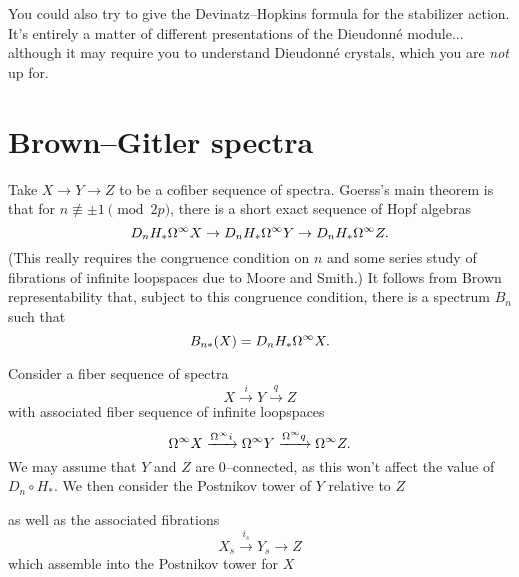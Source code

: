 You could also try to give the Devinatz--Hopkins formula for the stabilizer action.  It's entirely a matter of different presentations of the Dieudonn\'e module... although it may require you to understand Dieudonn\'e crystals, which you are \emph{not} up for.







\section{Brown--Gitler spectra}

Take $X \to Y \to Z$ to be a cofiber sequence of spectra.  Goerss's main theorem is that for $n \not\equiv \pm 1 \pmod{2p}$, there is a short exact sequence of Hopf algebras \[D_n H_* \Omega^\infty X \to D_n H_* \Omega^\infty Y \to D_n H_* \Omega^\infty Z.\]  (This really requires the congruence condition on $n$ and some series study of fibrations of infinite loopspaces due to Moore and Smith.)  It follows from Brown representability that, subject to this congruence condition, there is a spectrum $B_n$ such that \[B_{n*}(X) = D_n H_* \Omega^\infty X.\]




Consider a fiber sequence of spectra \[X \xrightarrow i Y \xrightarrow q Z\] with associated fiber sequence of infinite loopspaces \[\Omega^\infty X \xrightarrow{\Omega^\infty i} \Omega^\infty Y \xrightarrow{\Omega^\infty q} \Omega^\infty Z.\]  We may assume that $Y$ and $Z$ are $0$--connected, as this won't affect the value of $D_n \circ H_*$.  We then consider the Postnikov tower of $Y$ relative to $Z$
\begin{center}
\end{center}
as well as the associated fibrations \[X_s \xrightarrow{i_s} Y_s \to Z\] which assemble into the Postnikov tower for $X$
\begin{center}
\end{center}

